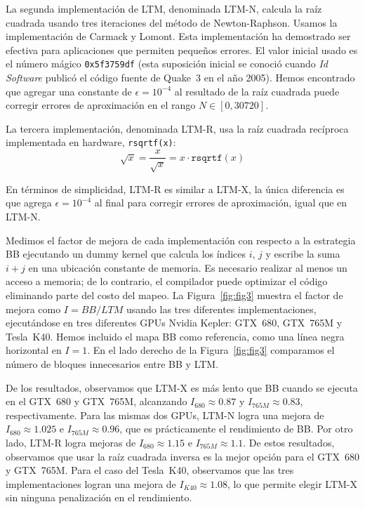 \documentclass[twocolumn,10pt,a4paper]{article}
\begin{document}
La segunda implementación de LTM, denominada LTM-N, calcula la raíz cuadrada
usando tres iteraciones del método de Newton-Raphson.
Usamos la implementación de Carmack y Lomont. Esta implementación ha demostrado
ser efectiva para aplicaciones que permiten pequeños errores. El valor inicial
usado es el número mágico \texttt{0x5f3759df} (esta suposición inicial se
conoció cuando \textit{Id Software} publicó el código fuente de Quake~3 en el
año 2005). Hemos encontrado que agregar una constante de
$\epsilon = 10^{-4}$ al resultado de la raíz cuadrada puede corregir errores
de aproximación en el rango $N \in [0, 30720]$.

La tercera implementación, denominada LTM-R, usa la raíz cuadrada recíproca
implementada en hardware, \texttt{rsqrtf(x)}:
\begin{equation}
\sqrt{x} = \frac{x}{\sqrt{x}} = x \cdot \texttt{rsqrtf}(x)
\label{eq:rsqrt}
\end{equation}

En términos de simplicidad, LTM-R es similar a LTM-X, la única diferencia es
que agrega $\epsilon = 10^{-4}$ al final para corregir errores de aproximación,
igual que en LTM-N.

Medimos el factor de mejora de cada implementación con respecto a la estrategia
BB ejecutando un dummy kernel que calcula los índices $i$, $j$ y escribe la
suma $i + j$ en una ubicación constante de memoria. Es necesario realizar al
menos un acceso a memoria; de lo contrario, el compilador puede optimizar el
código eliminando parte del costo del mapeo. La Figura~\ref{fig:fig3} muestra
el factor de mejora como $I = BB/LTM$ usando las tres diferentes
implementaciones, ejecutándose en tres diferentes GPUs Nvidia Kepler: GTX~680,
GTX~765M y Tesla~K40. Hemos incluido el mapa BB como referencia, como una
línea negra horizontal en $I = 1$. En el lado derecho de la
Figura~\ref{fig:fig3} comparamos el número de bloques innecesarios entre BB
y LTM.

De los resultados, observamos que LTM-X es más lento que BB cuando se ejecuta
en el GTX~680 y GTX~765M, alcanzando $I_{680} \approx 0.87$ y
$I_{765M} \approx 0.83$, respectivamente. Para las mismas dos GPUs, LTM-N
logra una mejora de $I_{680} \approx 1.025$ e $I_{765M} \approx 0.96$, que
es prácticamente el rendimiento de BB. Por otro lado, LTM-R logra mejoras de
$I_{680} \approx 1.15$ e $I_{765M} \approx 1.1$. De estos resultados,
observamos que usar la raíz cuadrada inversa es la mejor opción para el
GTX~680 y GTX~765M. Para el caso del Tesla~K40, observamos que las tres
implementaciones logran una mejora de $I_{K40} \approx 1.08$, lo que permite
elegir LTM-X sin ninguna penalización en el rendimiento.
\end{document}

